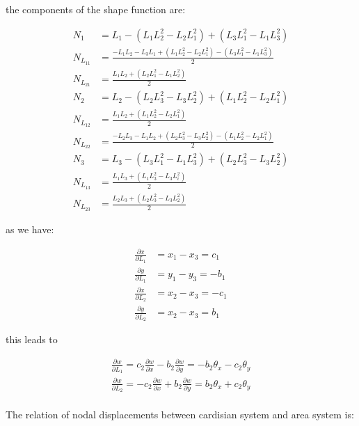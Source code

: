 the components of the shape function are:

\begin{align*}
	N_1 &= L_1 -(L_1 L_2^2 - L_2 L_1^2) + (L_3 L_1^2 - L_1 L_3^2) \\
	N_{L_{11}} &= \frac{-L_1 L_2 - L_3 L_1 + (L_1 L_2^2 - L_2 L_1^2) - (L_3 L_1^2 - L_1 L_3^2)}{2} \\
	N_{L_{21}} &= \frac{L_1 L_2 + (L_2 L_1^2 - L_1 L_2^2)}{2} \\
	N_{2} &= L_2 -(L_2 L_3^2-L_3 L_2^2) + (L_1 L_2^2 -L_2 L_1^2) \\
	N_{L_{12}} &= \frac{L_1 L_2 + (L_1 L_2^2 - L_2 L_1^2)}{2} \\
	N_{L_{22}} &= \frac{-L_2 L_3 - L_1 L_2 +(L_2 L_3^2-L_3 L_2^2)- (L_1 L_2^2 - L_2 L_1^2)}{2} \\
	N_3 &= L_3 - (L_3 L_1^2 -L_1 L_3^2) + (L_2 L_3^2 - L_3 L_2^2) \\
	N_{L_{13}} &= \frac{L_1 L_3 + (L_1 L_3^2 - L_3 L_i^2)}{2} \\
	N_{L_{23}} &= \frac{L_2 L_3 + (L_2 L_3^2 - L_3 L_2^2)}{2}
\end{align*}

as we have:

\begin{equation}
\begin{split}
\frac{\partial x}{\partial L_1} &= x_1 - x_3 = c_1 \\
\frac{\partial y}{\partial L_1} &= y_1 - y_3 = -b_1 \\
\frac{\partial x}{\partial L_2} &= x_2 - x_3 = -c_1 \\
\frac{\partial y}{\partial L_2} &= x_2 - x_3 = b_1
\end{split}
\end{equation}

this leads to

\begin{equation}\label{key}
\begin{split}
\frac{\partial w}{\partial L_1} = c_2 \frac{\partial w}{\partial x} - b_2 \frac{\partial w}{\partial y} = -b_2 \theta_x - c_2 \theta_y \\
\frac{\partial w}{\partial L_2} = -c_2 \frac{\partial w}{\partial x} + b_2 \frac{\partial w}{\partial y} = b_2 \theta_x + c_2 \theta_y \\
\end{split}
\end{equation}

The relation of nodal displacements between cardisian system and area system is:

